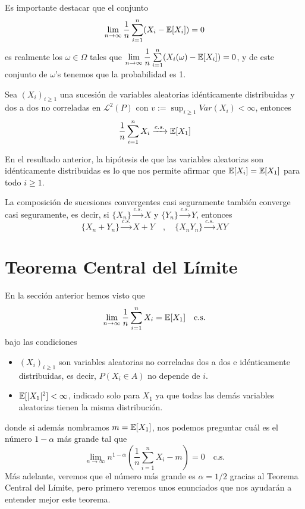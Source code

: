 \begin{observacion}
    Es importante destacar que el conjunto 
    $$\lim_{n\to \infty} \dfrac{1}{n} \sum_{i=1}^n (X_i - \mathbb{E}[X_i]) = 0 $$
    es realmente los $\omega \in \Omega$ tales que $\lim\limits_{n\to \infty} \dfrac{1}{n} \sum\limits_{i=1}^n (X_i(\omega) - \mathbb{E}[X_i]) = 0$, y de este conjunto de $\omega$'s tenemos que la probabilidad es 1.
\end{observacion}

\begin{coro}
    Sea $(X_i)_{i\geq 1}$ una sucesión de variables aleatorias idénticamente distribuidas y dos a dos no correladas en $\mathcal{L}^2(P)$ con $v:=\sup_{i\geq 1} Var(X_i) < \infty$, entonces
    \begin{equation*}
        \dfrac{1}{n} \sum_{i=1}^n X_i \xrightarrow{c.s.} \mathbb{E}[X_1]
    \end{equation*}
\end{coro}

\noindent
En el resultado anterior, la hipótesis de que las variables aleatorias son idénticamente distribuidas es lo que nos permite afirmar que $\mathbb{E}[X_i] = \mathbb{E}[X_1]$ para todo $i\geq 1$.

\begin{prop}
    La composición de sucesiones convergentes casi seguramente también converge casi seguramente, es decir, si $\{X_n\} \xrightarrow{c.s.} X$ y $\{Y_n\} \xrightarrow{c.s.} Y$, entonces
    \begin{equation*}
        \{X_n + Y_n\} \xrightarrow{c.s.} X + Y \quad , \quad \{X_n Y_n\} \xrightarrow{c.s.} XY
    \end{equation*}
\end{prop}

\section{Teorema Central del Límite}
\noindent
En la sección anterior hemos visto que 
\begin{equation*}
    \lim_{n\to \infty} \dfrac{1}{n} \sum_{i=1}^n X_i = \mathbb{E}[X_1] \quad \text{c.s.}
\end{equation*}
bajo las condiciones 
\begin{itemize}
    \item $(X_i)_{i\geq 1}$ son variables aleatorias no correladas dos a dos e idénticamente distribuidas, es decir, $P(X_i\in A)$ no depende de $i$.
    \item $\mathbb{E}[|X_1|^2] < \infty$, indicado solo para $X_1$ ya que todas las demás variables aleatorias tienen la misma distribución.
\end{itemize}
donde si además nombramos $m = \mathbb{E}[X_1]$, nos podemos preguntar cuál es el número $1-\alpha$ más grande tal que
\begin{equation*}
    \lim_{n\to \infty} n^{1-\alpha} \left( \dfrac{1}{n} \sum_{i=1}^n X_i - m \right) = 0 \quad \text{c.s.}
\end{equation*}
Más adelante, veremos que el número más grande es $\alpha = 1/2$ gracias al Teorema Central del Límite, pero primero veremos unos enunciados que nos ayudarán a entender mejor este teorema.

